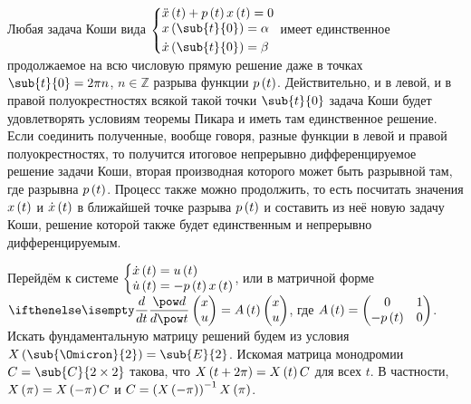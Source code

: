 \documentclass[a5paper,10pt]{article}
\begin{document}
Любая задача Коши вида 
$\tsys{\ddot {x}\br{t} + p\br{t} x\br{t} = 0 \\
    x\br{\sub{t}{0}} = \alpha \\[1mm]
    \dot{x}\br{\sub{t}{0}} = \beta}$
имеет единственное продолжаемое на всю числовую прямую решение 
даже в точках $\sub{t}{0} = 2\pi n$, $n \in \mathbb{Z}$ разрыва функции $p\left(\hspace{0.01em}t\hspace{0.01em}\right)$.
Действительно, и в левой, и в правой полуокрестностях всякой такой точки 
$\sub{t}{0}$ задача Коши будет удовлетворять условиям теоремы Пикара и иметь там единственное решение.
Если соединить полученные, вообще говоря, разные функции в левой и правой полуокрестностях,
то получится итоговое непрерывно дифференцируемое решение задачи Коши,
вторая производная которого может быть разрывной там, где разрывна $p\left(\hspace{0.01em}t\hspace{0.01em}\right)$.
Процесс также можно продолжить, то есть посчитать значения 
$x\left(\hspace{0.01em}t\hspace{0.01em}\right)$ и $\dot{x}\left(\hspace{0.01em}t\hspace{0.01em}\right)$ в ближайшей точке разрыва $p\left(\hspace{0.01em}t\hspace{0.01em}\right)$ 
и составить из неё новую задачу Коши, решение которой также будет 
единственным и непрерывно дифференцируемым.

Перейдём к системе 
$\tsys{\dot{x}\br{t} = u\br{t} \\ \dot{u}\br{t} = -p\br{t} x\br{t}}$,
или в матричной форме 
$\der{}{t}
    \begin{pmatrix} x \\ u \end{pmatrix}
    = A\br{t}
    \begin{pmatrix} x \\ u \end{pmatrix}$, где 
$A\left(\hspace{0.01em}t\hspace{0.01em}\right) = \begin{pmatrix}0 & 1 
    \\ -p\left(\hspace{0.01em}t\hspace{0.01em}\right) & 0 \end{pmatrix}$.
Искать фундаментальную матрицу решений будем из условия
$X\br{\sub{\Omicron}{2}} = \sub{E}{2}$. 
Искомая матрица монодромии $C = \sub{C}{2 \times 2}$ такова, что
$X\left(\hspace{0.01em}t + 2\pi\hspace{0.01em}\right) = X\left(\hspace{0.01em}t\hspace{0.01em}\right) C$ для всех $t$.
В частности, $X\left(\hspace{0.01em}\pi\hspace{0.01em}\right) = X\left(\hspace{0.01em}-\pi\hspace{0.01em}\right) C$ и $C = \left(\hspace{0.01em}X\left(\hspace{0.01em}-\pi\hspace{0.01em}\right)\hspace{0.01em}\right)^{-1} X\left(\hspace{0.01em}\pi\hspace{0.01em}\right)$.
\end{document}
